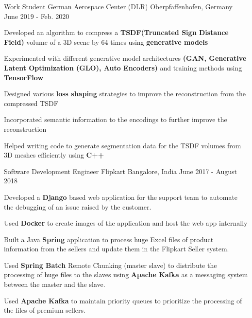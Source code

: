 \begin{cventries}
  \cventry
  {Work Student} %
  {German Aerospace Center (DLR)} %
  {Oberpfaffenhofen, Germany} %
  {June 2019 - Feb. 2020} %
  {
  \begin{cvitems} %
    \item {Developed an algorithm to compress a \textbf{TSDF(Truncated Sign
    Distance Field)} volume of a 3D scene by 64 times using \textbf{generative
    models}}
    \item {Experimented with different generative model architectures
    \textbf{(GAN, Generative Latent Optimization (GLO), Auto Encoders)} and
    training methods using \textbf{TensorFlow}}
    \item {Designed various \textbf{loss shaping} strategies to improve the
    reconstruction from the compressed TSDF}
    \item {Incorporated semantic information to the encodings to further improve the reconstruction}
    \item {Helped writing code to generate segmentation data for the TSDF
    volumes from 3D meshes efficiently using \textbf{C++}}
  \end{cvitems}
  }

  \cventry
  {Software Development Engineer} %
  {Flipkart} %
  {Bangalore, India} %
  {June 2017 - August 2018} %
  {
  \begin{cvitems} %
    \item {Developed a \textbf{Django} based web application for the support
    team to automate the debugging of an issue raised by the customer.}
    \item {Used \textbf{Docker} to create images of the application and host the
    web app internally}
    \item {Built a Java \textbf{Spring} application to process huge Excel files
    of product information from the sellers and update them in the Flipkart
    Seller system.}
    \item {Used \textbf{Spring Batch} Remote Chunking (master slave) to
    distribute the processing of huge files to the slaves using \textbf{Apache
    Kafka} as a messaging system between the master and the slave.}
    \item {Used \textbf{Apache Kafka} to maintain priority queues to prioritize
    the processing of the files of premium sellers.}
  \end{cvitems}
  }


\end{cventries}
